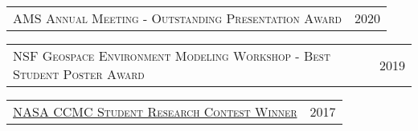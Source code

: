 \documentclass[10pt]{article}
\begin{document}

\begin{tabular}{p{15.75cm} p{3.25cm}}
{\textsc{\normalsize{AMS Annual Meeting - Outstanding Presentation Award}}} & \normalsize{2020}
\end{tabular}

\begin{tabular}{p{15.75cm} p{3.25cm}}
{\textsc{\normalsize{NSF Geospace Environment Modeling Workshop - Best Student Poster Award}}} & \normalsize{2019}
\end{tabular}





\begin{tabular}{p{15.75cm} p{3.25cm}}
\href{https://ccmc.gsfc.nasa.gov/support/contest-2017/contestresults.php}{\textsc{\normalsize{NASA CCMC Student Research Contest Winner}}} & \normalsize{2017} %
\end{tabular}
\end{document}
